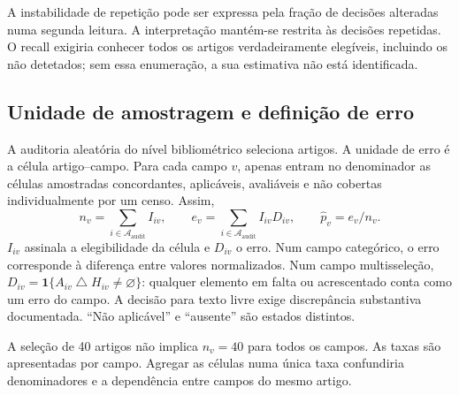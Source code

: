 A instabilidade de repetição pode ser expressa pela fração de decisões alteradas numa segunda leitura. A interpretação mantém-se restrita às decisões repetidas. O recall exigiria conhecer todos os artigos verdadeiramente elegíveis, incluindo os não detetados; sem essa enumeração, a sua estimativa não está identificada.

\subsection{Unidade de amostragem e definição de erro}
\label{sec:mat-auditoria-amostra}
A auditoria aleatória do nível bibliométrico seleciona artigos. A unidade de erro é a célula artigo--campo. Para cada campo $v$, apenas entram no denominador as células amostradas concordantes, aplicáveis, avaliáveis e não cobertas individualmente por um censo. Assim,
\begin{equation}
n_v=\sum_{i\in\mathcal A_{\mathrm{audit}}}I_{iv},
\qquad e_v=\sum_{i\in\mathcal A_{\mathrm{audit}}}I_{iv}D_{iv},
\qquad \widehat p_v=e_v/n_v.
\label{eq:mat-erro-auditoria}
\end{equation}
$I_{iv}$ assinala a elegibilidade da célula e $D_{iv}$ o erro. Num campo categórico, o erro corresponde à diferença entre valores normalizados. Num campo multisseleção, $D_{iv}=\mathbf1\{A_{iv}\mathbin\triangle H_{iv}\neq\varnothing\}$: qualquer elemento em falta ou acrescentado conta como um erro do campo. A decisão para texto livre exige discrepância substantiva documentada. ``Não aplicável'' e ``ausente'' são estados distintos.

A seleção de 40 artigos não implica $n_v=40$ para todos os campos. As taxas são apresentadas por campo. Agregar as células numa única taxa confundiria denominadores e a dependência entre campos do mesmo artigo.

